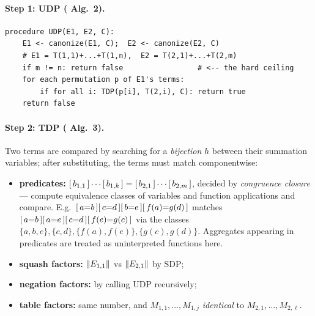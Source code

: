 
\paragraph{Step 1: \textsc{UDP} (\cite{udp} Alg.\ 2).}
\begin{lstlisting}[style=pseudo]
procedure UDP(E1, E2, C):
    E1 <- canonize(E1, C);  E2 <- canonize(E2, C)
    # E1 = T(1,1)+...+T(1,n),  E2 = T(2,1)+...+T(2,m)
    if m != n: return false                 # <-- the hard ceiling
    for each permutation p of E1's terms:
        if for all i: TDP(p[i], T(2,i), C): return true
    return false
\end{lstlisting}

\paragraph{Step 2: \textsc{TDP} (\cite{udp} Alg.\ 3).}
Two terms are compared by searching for a \emph{bijection} $h$ between their summation
variables; after substituting, the terms must match componentwise:
\begin{itemize}
\item \textbf{predicates:} $[\,b_{1,1}\,]\cdots[\,b_{1,k}\,] = [\,b_{2,1}\,]\cdots[\,b_{2,m}\,]$,
      decided by \emph{congruence closure} --- compute equivalence classes of variables and
      function applications and compare. E.g.\ $[\,a{=}b\,][\,c{=}d\,][\,b{=}e\,][\,f(a){=}g(d)\,]$
      matches $[\,a{=}b\,][\,a{=}e\,][\,c{=}d\,][\,f(e){=}g(c)\,]$ via the classes
      $\{a,b,e\},\{c,d\},\{f(a),f(e)\},\{g(c),g(d)\}$. Aggregates appearing in predicates are
      treated as uninterpreted functions here.
\item \textbf{squash factors:} $\left\lVert E_{1,1} \right\rVert$ vs $\left\lVert E_{2,1} \right\rVert$ by \textsc{SDP};
\item \textbf{negation factors:} by calling \textsc{UDP} recursively;
\item \textbf{table factors:} same number, and $M_{1,1},\dots,M_{1,j}$ \emph{identical} to
      $M_{2,1},\dots,M_{2,\ell}$.
\end{itemize}

